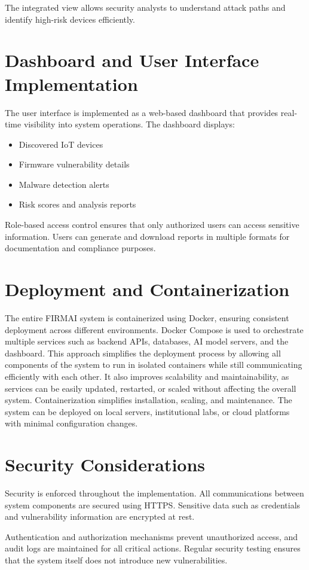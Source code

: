 The integrated view allows security analysts to understand attack paths and identify high-risk devices efficiently.

\section{Dashboard and User Interface Implementation}
The user interface is implemented as a web-based dashboard that provides real-time visibility into system operations. The dashboard displays:
\begin{itemize}
	\item Discovered IoT devices
	\item Firmware vulnerability details
	\item Malware detection alerts
	\item Risk scores and analysis reports
\end{itemize}

Role-based access control ensures that only authorized users can access sensitive information. Users can generate and download reports in multiple formats for documentation and compliance purposes.

\section{Deployment and Containerization}
The entire FIRMAI system is containerized using Docker, ensuring consistent deployment across different environments. Docker Compose is used to orchestrate multiple services such as backend APIs, databases, AI model servers, and the dashboard. This approach simplifies the deployment process by allowing all components of the system to run in isolated containers while still communicating efficiently with each other. It also improves scalability and maintainability, as services can be easily updated, restarted, or scaled without affecting the overall system.
Containerization simplifies installation, scaling, and maintenance. The system can be deployed on local servers, institutional labs, or cloud platforms with minimal configuration changes.

\section{Security Considerations}
Security is enforced throughout the implementation. All communications between system components are secured using HTTPS. Sensitive data such as credentials and vulnerability information are encrypted at rest.

Authentication and authorization mechanisms prevent unauthorized access, and audit logs are maintained for all critical actions. Regular security testing ensures that the system itself does not introduce new vulnerabilities.